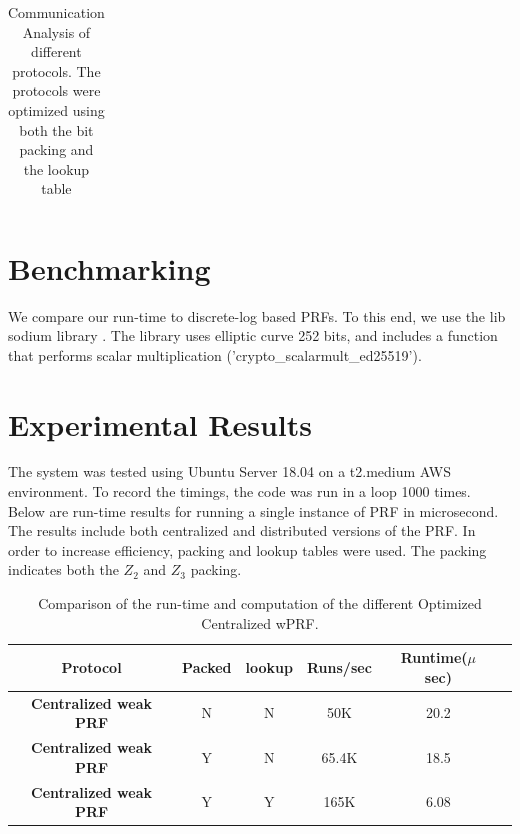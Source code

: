 \begin{table}[htbp]
\begin{center}
\begin{tabular}{|c|c|c|c|c|}
		\end{tabular}
		
		\vspace{-1mm}
		\caption{Communication Analysis of different protocols. The protocols were optimized using both the bit packing and the lookup table}
		\label{CommunicationCosts}
	\end{center}
	\vspace{-5mm}
\end{table}


\section{Benchmarking}

We compare our run-time to discrete-log based PRFs. To this end, we use the lib sodium library \cite{LibSodium}. The library uses elliptic curve 252 bits, and includes a function that performs scalar multiplication ('crypto\_scalarmult\_ed25519').


\section{Experimental Results}

The system was tested using Ubuntu Server 18.04 on a t2.medium AWS environment. To record the timings, the code was run in a loop 1000 times. Below are run-time results for running a single instance of PRF in microsecond. The results include both centralized and distributed versions of the PRF. In order to increase efficiency, packing and lookup tables were used. The packing indicates both the $Z_2$ and $Z_3$ packing.

\begin{table}[htbp]
	\begin{center}
		\begin{tabular}{|c|c|c|c|c|c|}
			\hline
			\textbf{Protocol} & \textbf{Packed }  &  \textbf{lookup} & \textbf{Runs/sec} & \textbf{Runtime($\mu$ sec)}\\
			\hline
			\hline
			\textbf{Centralized weak PRF}  & N  & N  &  50K&20.2 \\
			\hline
			\textbf{Centralized weak PRF} & Y  &  N & 65.4K &18.5  \\
			\hline
			\textbf{Centralized weak PRF} & Y  &  Y & 165K &6.08 \\
			\hline
		\end{tabular}
		
		\vspace{-1mm}
		\caption{Comparison of the run-time and computation of the different Optimized Centralized wPRF.}
		\label{CentralRuntimeTable}
	\end{center}
	\vspace{-5mm}
\end{table}

